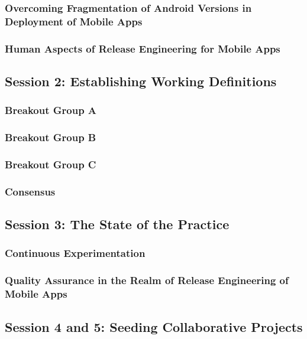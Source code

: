 \documentclass[a4paper]{article}
\begin{document}
\subsubsection{Overcoming Fragmentation of Android Versions in Deployment of Mobile Apps}

\subsubsection{Human Aspects of Release Engineering for Mobile Apps}

\subsection{Session 2: Establishing Working Definitions}

\subsubsection{Breakout Group A}

\subsubsection{Breakout Group B}

\subsubsection{Breakout Group C}

\subsubsection{Consensus}

\subsection{Session 3: The State of the Practice}

\subsubsection{Continuous Experimentation}

\subsubsection{Quality Assurance in the Realm of Release Engineering of Mobile Apps}

\subsection{Session 4 and 5: Seeding Collaborative Projects}
\end{document}
